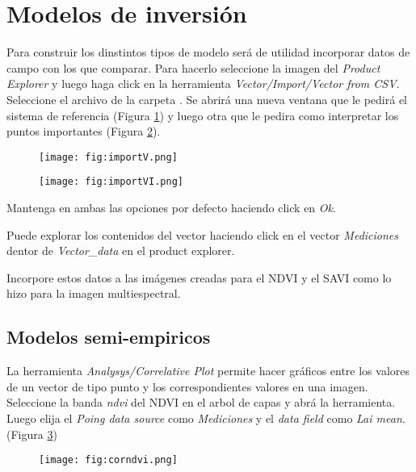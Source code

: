 \section{Modelos de inversión}

Para construir los dinstintos tipos de modelo será de utilidad incorporar datos de campo con los que comparar. Para hacerlo seleccione la imagen  del \emph{Product Explorer} y luego haga click en la herramienta \emph{Vector/Import/Vector from CSV}. Seleccione el archivo  de la carpeta . Se abrirá una nueva ventana que le pedirá el sistema de referencia (Figura \ref{fig:importV}) y luego otra que le pedira como interpretar los puntos importantes (Figura \ref{fig:importVI}).

\begin{figure}[h!]
    \centering
    \texttt{[image: fig:importV.png]}
    \caption{}
    \label{fig:importV}
\end{figure}

\begin{figure}[h!]
    \centering
    \texttt{[image: fig:importVI.png]}
    \caption{}
    \label{fig:importVI}
\end{figure}

Mantenga en ambas las opciones por defecto haciendo click en \emph{Ok}.

Puede explorar los contenidos del vector haciendo click en el vector \emph{Mediciones} dentor de \emph{Vector\_data} en el product explorer.

Incorpore estos datos a las imágenes creadas para el NDVI y el SAVI como lo hizo para la imagen multiespectral.

\subsection{Modelos semi-empiricos}

La herramienta \emph{Analysys/Correlative Plot} permite hacer gráficos entre los valores de un vector de tipo punto y los correspondientes valores en una imagen. Seleccione la banda \emph{ndvi} del NDVI en el arbol de capas y abrá la herramienta. Luego elija el \emph{Poing data source} como \emph{Mediciones} y el \emph{data field} como \emph{Lai mean}. (Figura \ref{fig:corndvi})

\begin{figure}[h!]
    \centering
    \texttt{[image: fig:corndvi.png]}
    \caption{}
    \label{fig:corndvi}
\end{figure}

